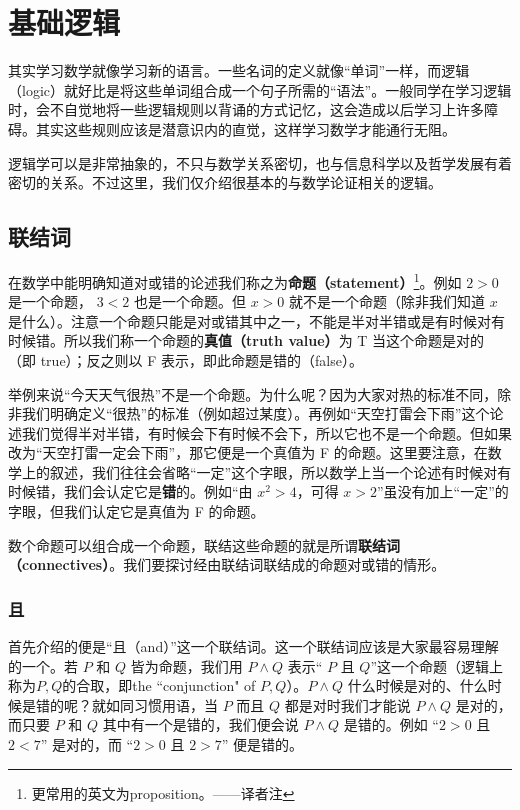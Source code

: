 

\chapter{基础逻辑}

其实学习数学就像学习新的语言。一些名词的定义就像“单词”一样，而逻辑（logic）就好比是将这些单词组合成一个句子所需的“语法”。一般同学在学习逻辑时，会不自觉地将一些逻辑规则以背诵的方式记忆，这会造成以后学习上许多障碍。其实这些规则应该是潜意识内的直觉，这样学习数学才能通行无阻。

逻辑学可以是非常抽象的，不只与数学关系密切，也与信息科学以及哲学发展有着密切的关系。不过这里，我们仅介绍很基本的与数学论证相关的逻辑。

\section{联结词}

在数学中能明确知道对或错的论述我们称之为\textbf{命题（statement）}\footnote{更常用的英文为proposition。——译者注}。例如 \(2 > 0\) 是一个命题， \(3 < 2\) 也是一个命题。但 \(x > 0\) 就不是一个命题（除非我们知道 \(x\) 是什么）。注意一个命题只能是对或错其中之一，不能是半对半错或是有时候对有时候错。所以我们称一个命题的\textbf{真值（truth value）}为 T 当这个命题是对的（即 true）；反之则以 F 表示，即此命题是错的（false）。

举例来说“今天天气很热”不是一个命题。为什么呢？因为大家对热的标准不同，除非我们明确定义“很热”的标准（例如超过某度）。再例如“天空打雷会下雨”这个论述我们觉得半对半错，有时候会下有时候不会下，所以它也不是一个命题。但如果改为“天空打雷一定会下雨”，那它便是一个真值为 F 的命题。这里要注意，在数学上的叙述，我们往往会省略“一定”这个字眼，所以数学上当一个论述有时候对有时候错，我们会认定它是\textbf{错}的。例如“由 \(x^{2} > 4\)，可得 \(x > 2\)”虽没有加上“一定”的字眼，但我们认定它是真值为 F 的命题。

数个命题可以组合成一个命题，联结这些命题的就是所谓\textbf{联结词（connectives）}。我们要探讨经由联结词联结成的命题对或错的情形。

\subsection{且}
首先介绍的便是“且（and）”这一个联结词。这一个联结词应该是大家最容易理解的一个。若 \(P\) 和 \(Q\) 皆为命题，我们用 \(P \land Q\) 表示“ \(P\) 且 \(Q\)”这一个命题（逻辑上称为\(P, Q\)的合取，即the ``conjunction" of \(P, Q\)）。\(P \land Q\) 什么时候是对的、什么时候是错的呢？就如同习惯用语，当 \(P\) 而且 \(Q\) 都是对时我们才能说 \(P \land Q\) 是对的，而只要 \(P\) 和 \(Q\) 其中有一个是错的，我们便会说 \(P \land Q\) 是错的。例如 “\(2 > 0\) 且 \(2 < 7\)” 是对的，而 “\(2 > 0\) 且 \(2 > 7\)” 便是错的。

